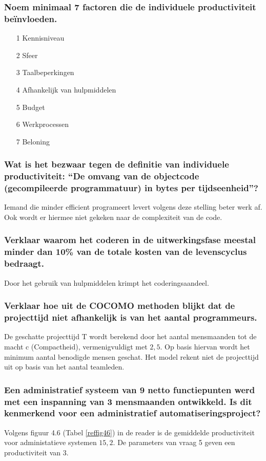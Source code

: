\documentclass[a4paper,titlepage]{artikel1}
\begin{document}
   \subsubsection[Opdracht 1]{Noem minimaal 7 factoren die de individuele productiviteit be\"invloeden.}
   \begin{itemize}
    \item[1] Kennisniveau
    \item[2] Sfeer
    \item[3] Taalbeperkingen
    \item[4] Afhankelijk van hulpmiddelen
    \item[5] Budget
    \item[6] Werkprocessen
    \item[7] Beloning
   \end{itemize}
   
   \subsubsection[Opdracht 2]{Wat is het bezwaar tegen de definitie van
   individuele productiviteit: ``De omvang van de objectcode
   (gecompileerde programmatuur) in bytes per tijdseenheid''?}
   Iemand die minder efficient programeert levert volgens deze stelling beter werk af. Ook wordt er hiermee niet gekeken naar de complexiteit van de code.
   
   \subsubsection[Opdracht 3]{Verklaar waarom het coderen in de
   uitwerkingsfase meestal minder dan 10\% van de totale kosten van de levenscyclus bedraagt.}
   Door het gebruik van hulpmiddelen krimpt het coderingsaandeel.
   
   \subsubsection[Opdracht 4]{Verklaar hoe uit de COCOMO methoden blijkt dat de projecttijd niet afhankelijk is van het aantal programmeurs.}
   De geschatte projecttijd T wordt berekend door het aantal mensmaanden tot de macht c (Compactheid), vermenigvuldigt met $2,5$. Op basis hiervan wordt het minimum aantal benodigde mensen geschat. Het model rekent niet de projecttijd uit op basis van het aantal teamleden.

   \subsubsection[Opdracht 5]{Een administratief systeem van 9 netto
   functiepunten werd met een inspanning van 3 mensmaanden
   ontwikkeld. Is dit kenmerkend voor een administratief
   automatiseringsproject?}
   Volgens figuur 4.6 (Tabel \ref{reffig46}) in de reader is de gemiddelde productiviteit voor administatieve systemen $15,2$. De parameters van vraag 5 geven een productiviteit van $3$.
\end{document}
